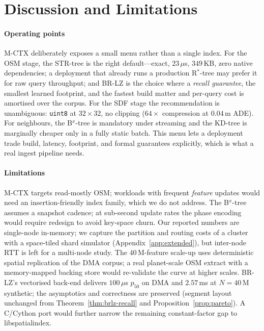 \section{Discussion and Limitations}\label{sec:discuss}

\paragraph*{Operating points}
M-CTX deliberately exposes a small menu rather than a single index. For the
OSM stage, the STR-tree is the right default---exact, $23$\,$\mu$s,
$349$\,KB, zero native dependencies; a deployment that already runs a
production R$^{*}$-tree may prefer it for raw query throughput; and BR-LZ
is the choice where a \emph{recall guarantee}, the smallest learned
footprint, and the fastest build matter and per-query cost is amortised
over the corpus. For the SDF stage the recommendation is unambiguous:
\texttt{uint8} at $32\!\times\!32$, no clipping ($64\times$ compression at
$0.04$\,m ADE). For neighbours, the B$^{x}$-tree is mandatory under
streaming and the KD-tree is marginally cheaper only in a fully static
batch. This menu lets a deployment trade build, latency, footprint, and
formal guarantees explicitly, which is what a real ingest pipeline needs.

\paragraph*{Limitations}
M-CTX targets read-mostly OSM; workloads with frequent \emph{feature}
updates would need an insertion-friendly index family, which we do not
address. The B$^{x}$-tree assumes a snapshot cadence; at sub-second update
rates the phase encoding would require redesign to avoid key-space churn.
Our reported numbers are single-node in-memory; we capture the
partition and routing costs of a cluster with a space-tiled shard
simulator (Appendix~\ref{app:extended}), but inter-node RTT is left for a
multi-node study. The $40$\,M-feature scale-up uses deterministic spatial
replication of the DMA corpus; a real planet-scale OSM extract with a
memory-mapped backing store would re-validate the curve at higher scales.
BR-LZ's vectorised back-end delivers $100$\,$\mu$s $p_{50}$ on DMA and $2.57$\,ms at $N{=}40$\,M synthetic; the asymptotics and correctness are preserved (segment layout unchanged from Theorem~\ref{thm:brlz-recall} and Proposition~\ref{prop:pareto}).  A C/Cython port would further narrow the remaining constant-factor gap to libspatialindex.
